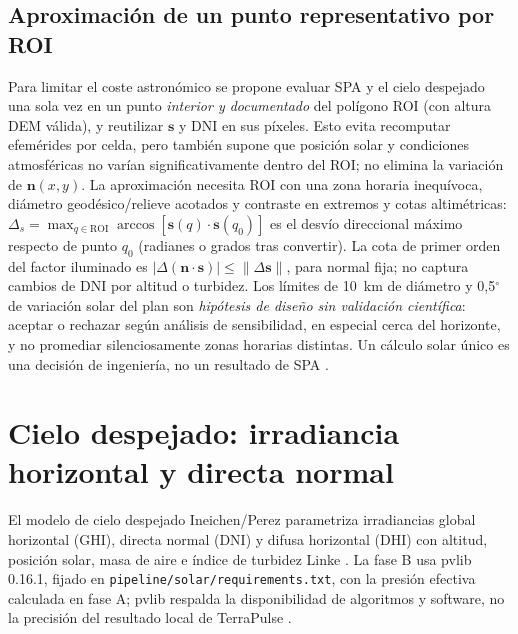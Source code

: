 \documentclass[11pt,a4paper]{article}
\begin{document}
\subsection{Aproximación de un punto representativo por ROI}
Para limitar el coste astronómico se propone evaluar SPA y el cielo despejado una sola vez en un punto \emph{interior y documentado} del polígono ROI (con altura DEM válida), y reutilizar $\mathbf s$ y DNI en sus píxeles. Esto evita recomputar efemérides por celda, pero también supone que posición solar y condiciones atmosféricas no varían significativamente dentro del ROI; no elimina la variación de $\mathbf n(x,y)$. La aproximación necesita ROI con una zona horaria inequívoca, diámetro geodésico/relieve acotados y contraste en extremos y cotas altimétricas: $\Delta_s=\max_{q\in\mathrm{ROI}}\arccos[\mathbf s(q)\cdot\mathbf s(q_0)]$ es el desvío direccional máximo respecto de punto $q_0$ (radianes o grados tras convertir). La cota de primer orden del factor iluminado es $|\Delta(\mathbf n\cdot\mathbf s)|\leq\|\Delta\mathbf s\|$, para normal fija; no captura cambios de DNI por altitud o turbidez. Los límites de 10~km de diámetro y 0,5$^\circ$ de variación solar del plan son \emph{hipótesis de diseño sin validación científica}: aceptar o rechazar según análisis de sensibilidad, en especial cerca del horizonte, y no promediar silenciosamente zonas horarias distintas. Un cálculo solar único es una decisión de ingeniería, no un resultado de SPA \cite{reda2004}.

\section{Cielo despejado: irradiancia horizontal y directa normal}
El modelo de cielo despejado Ineichen/Perez parametriza irradiancias global horizontal (GHI), directa normal (DNI) y difusa horizontal (DHI) con altitud, posición solar, masa de aire e índice de turbidez Linke \cite{ineichen2002}. La fase B usa pvlib 0.16.1, fijado en \texttt{pipeline/solar/requirements.txt}, con la presión efectiva calculada en fase A;  pvlib respalda la disponibilidad de algoritmos y software, no la precisión del resultado local de TerraPulse \cite{holmgren2018,pvlibineichen,pvliblocation,pvlibspa}.
\end{document}
